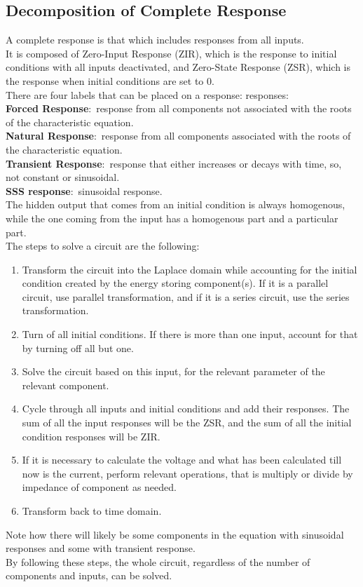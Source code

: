 \documentclass[nobib]{tufte-handout}
\newcommand{\defn}[2]{\noindent\textbf{#1}:\ #2}
\begin{document}
\subsection{Decomposition of Complete Response}
A complete response is that which includes responses from all inputs.\\ It is
composed of Zero-Input Response (ZIR), which is the response to initial
conditions with all inputs deactivated, and Zero-State Response (ZSR), which is
the response when initial conditions are set to 0.\\ There are four labels that
can be placed on a response: responses:\\ \defn{Forced Response}{response from
    all components not associated with the roots of the characteristic equation.}\\
\defn{Natural Response}{response from all components associated with the roots
    of the characteristic equation.}\\ \defn{Transient Response}{response that
    either increases or decays with time, so, not constant or sinusoidal.}\\
\defn{SSS response}{sinusoidal response.}\\ The hidden output that comes from
an initial condition is always homogenous, while the one coming from the input
has a homogenous part and a particular part.\\ The steps to solve a circuit are
the following:\\
\begin{enumerate}
    \item Transform the circuit into the Laplace domain while accounting for the initial
          condition created by the energy storing component(s). If it is a parallel
          circuit, use parallel transformation, and if it is a series circuit, use the
          series transformation.
    \item Turn of all initial conditions. If there is more than one input, account for
          that by turning off all but one.
    \item Solve the circuit based on this input, for the relevant parameter of the
          relevant component.
    \item Cycle through all inputs and initial conditions and add their responses. The
          sum of all the input responses will be the ZSR, and the sum of all the initial
          condition responses will be ZIR.
    \item If it is necessary to calculate the voltage and what has been calculated till
          now is the current, perform relevant operations, that is multiply or divide by
          impedance of component as needed.
    \item Transform back to time domain.
\end{enumerate}
Note how there will likely be some components in the equation with sinusoidal responses and some with transient response.\\
By following these steps, the whole circuit, regardless of the number of components and inputs, can be solved.\\
\end{document}
